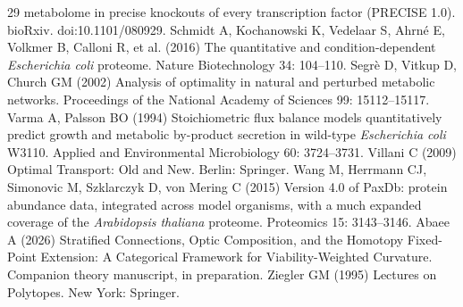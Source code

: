 \begin{thebibliography}{29}
             metabolome in precise knockouts of every transcription
             factor (PRECISE 1.0). bioRxiv. doi:10.1101/080929.
Schmidt A, Kochanowski K, Vedelaar S, Ahrn{\'e} E, Volkmer B, Calloni R, et al. (2016) The quantitative and condition-dependent \emph{Escherichia
             coli} proteome. Nature Biotechnology 34: 104--110.
Segr{\`e} D, Vitkup D, Church GM (2002) Analysis of optimality in natural and perturbed metabolic
             networks. Proceedings of the National Academy of Sciences 99: 15112--15117.
Varma A, Palsson BO (1994) Stoichiometric flux balance models quantitatively predict
             growth and metabolic by-product secretion in wild-type
             \emph{Escherichia coli} {W3110}. Applied and Environmental Microbiology 60: 3724--3731.
Villani C (2009) Optimal Transport: Old and New. Berlin: Springer.
Wang M, Herrmann CJ, Simonovic M, Szklarczyk D, von Mering C (2015) Version 4.0 of {PaxDb}: protein abundance data, integrated
             across model organisms, with a much expanded coverage of the
             \emph{Arabidopsis thaliana} proteome. Proteomics 15: 3143--3146.
Abaee A (2026) Stratified Connections, Optic Composition, and the Homotopy
           Fixed-Point Extension: A Categorical Framework for
           Viability-Weighted Curvature. Companion theory manuscript, in preparation.
Ziegler GM (1995) Lectures on Polytopes. New York: Springer.
\end{thebibliography}
